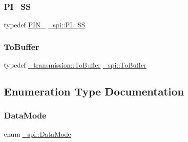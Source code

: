 \hypertarget{namespace__spi_a434315d1279c8f510156c8a5fc878ac7}{}\label{namespace__spi_a434315d1279c8f510156c8a5fc878ac7} 
\subsubsection{\texorpdfstring{P\+I\+\_\+\+SS}{PI\_SS}}
{\footnotesize\ttfamily typedef \hyperlink{ports_8h_a7a6229aeb00e502b02a6c6326d917ac3}{P\+I\+N\+\_} \hyperlink{namespace__spi_a434315d1279c8f510156c8a5fc878ac7}{\+\_\+spi\+::\+P\+I\+\_\+\+SS}}

\hypertarget{namespace__spi_aa6a43ffb968de9f9a86b6f1208fc6a12}{}\label{namespace__spi_aa6a43ffb968de9f9a86b6f1208fc6a12} 
\subsubsection{\texorpdfstring{To\+Buffer}{ToBuffer}}
{\footnotesize\ttfamily typedef \hyperlink{namespace__transmission_a43fedd4787676a3bbd1a35dbfa138f06}{\+\_\+transmission\+::\+To\+Buffer} \hyperlink{namespace__transmission_a43fedd4787676a3bbd1a35dbfa138f06}{\+\_\+spi\+::\+To\+Buffer}}



\subsection{Enumeration Type Documentation}
\hypertarget{namespace__spi_a5c653e646f3aaf1f111a058763cf9147}{}\label{namespace__spi_a5c653e646f3aaf1f111a058763cf9147} 
\subsubsection{\texorpdfstring{Data\+Mode}{DataMode}\hspace{0.1cm}{\footnotesize\ttfamily [1/2]}}
{\footnotesize\ttfamily enum \hyperlink{namespace__spi_a5c653e646f3aaf1f111a058763cf9147}{\+\_\+spi\+::\+Data\+Mode}\hspace{0.3cm}{\ttfamily [strong]}}

